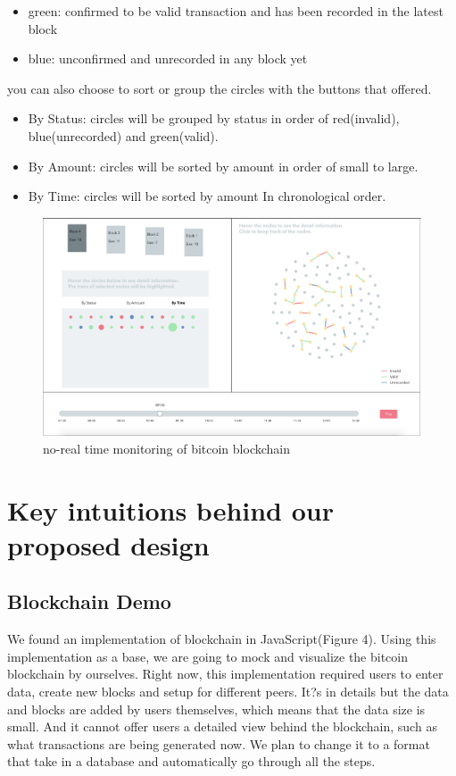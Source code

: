 \documentclass[journal, a4paper]{IEEEtran}
\begin{document}
\begin{itemize}
\begin{itemize}
        \item green: confirmed to be valid transaction and has been recorded in the latest block
        \item blue: unconfirmed and unrecorded in any block yet
    \end{itemize}
    you can also choose to sort or group the circles with the buttons that offered.
    \begin{itemize}
        \item By Status: circles will be grouped by status in order of red(invalid), blue(unrecorded) and green(valid).
        \item By Amount: circles will be sorted by amount in order of small to large.
        \item By Time: circles will be sorted by amount In chronological order. 
    \end{itemize}
\end{itemize}

\begin{figure}[!hbt]
		\begin{center}
		\includegraphics[width=\columnwidth]{overall_design.png}
		\caption{no-real time monitoring of bitcoin blockchain}
		\label{fig:overall_design}
		\end{center}
	\end{figure}

\section{Key intuitions behind our proposed design}
\subsection{Blockchain Demo}
We found an implementation of blockchain in JavaScript(Figure 4). Using this implementation as a base, we are going to mock and visualize the bitcoin blockchain by ourselves. Right now, this implementation required users to enter data, create new blocks and setup for different peers. It?s in details but the data and blocks are added by users themselves, which means that the data size is small. And it cannot offer users a detailed view behind the blockchain, such as what transactions are being generated now. We plan to change it to a format that take in a database and automatically go through all the steps. 
\end{document}
